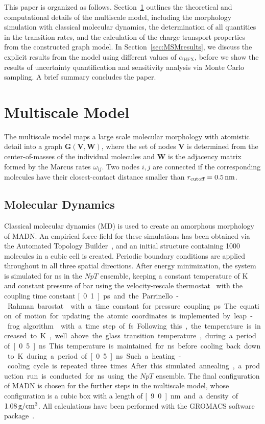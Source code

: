 \documentclass[%
 reprint,
superscriptaddress,
 amsmath,amssymb,
 aps,
prb,
floatfix
]{revtex4-2}
\begin{document}
This paper is organized as follows. Section~\ref{sec:model} outlines the theoretical and computational details of the multiscale model, including the morphology simulation with classical molecular dynamics, the determination of all quantities in the transition rates, and the calculation of the charge transport properties from the constructed graph model. In Section~\ref{sec:MSMresults}, we discuss the explicit results from the model using different values of $\alpha_\text{HFX}$, before we show the results of uncertainty quantification and sensitivity analysis via Monte Carlo sampling. A brief summary concludes the paper. 

\section{Multiscale Model}
\label{sec:model}
The multiscale model maps a large scale molecular morphology with atomistic detail into a graph $\mathbf{G}(\mathbf{V}, \mathbf{W})$, where the set of nodes $\mathbf{V}$ is determined from the center-of-masses of the individual molecules and $\mathbf{W}$ is the adjacency matrix formed by the Marcus rates $\omega_{ij}$. Two nodes $i,j$ are connected if the corresponding molecules have their closest-contact distance smaller than $r_\text{cutoff}=\unit[0.5]{nm}$. 

\subsection{Molecular Dynamics}
Classical molecular dynamics (MD) is used to create an amorphous morphology of MADN. An empirical force-field for these simulations has been obtained via the Automated Topology Builder~\cite{stroet_automated_2018}, and an initial structure containing 1000 molecules in a cubic cell is created. Periodic boundary conditions are applied throughout in all three spatial directions. 
After energy minimization, the system is simulated for \unit[1]{ns} in the $NpT$ ensemble, keeping a constant temperature of \unit[300]{K} and constant pressure of \unit[1]{bar} using the velocity-rescale thermostat~\cite{bussi_canonical_2007} with the coupling time constant \unit[0.1]{ps} and the Parrinello-Rahman barostat~\cite{parrinello_polymorphic_1981} with a time constant for pressure coupling \unit[2]{ps}. The equation of motion for updating the atomic coordinates is implemented by leap-frog algorithm~\cite{van_gunsteren_leap} with a time step of \unit[1]{fs}. Following this, the temperature is increased to \unit[800]{K}, well above the glass transition temperature, during a period of \unit[0.5]{ns}. This temperature is maintained for \unit[1]{ns} before cooling back down to \unit[300]{K} during a period of \unit[0.5]{ns}. Such a heating-cooling cycle is repeated three times. After this simulated annealing, a production run is conducted for \unit[2]{ns} using the $NpT$ ensemble. The final configuration of MADN is chosen for the further steps in the multiscale model, whose configuration is a cubic box with a length of \unit[9.0]{nm} and a density of $\unit[1.08]{g/cm^3}$. All calculations have been performed with the GROMACS software package~\cite{berendsen_gromacs_1995}.
\end{document}
